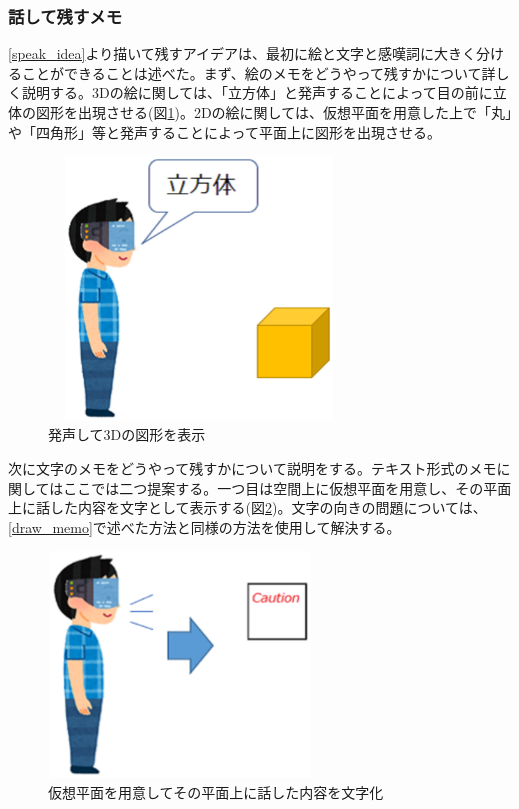 \documentclass[11pt,a4j, titlepage]{jarticle} %
\begin{document}
\subsubsection{話して残すメモ}
\ref{speak_idea}より描いて残すアイデアは、最初に絵と文字と感嘆詞に大きく分けることができることは述べた。まず、絵のメモをどうやって残すかについて詳しく説明する。3Dの絵に関しては、「立方体」と発声することによって目の前に立体の図形を出現させる(図\ref{fig:speak_3d})。2Dの絵に関しては、仮想平面を用意した上で「丸」や「四角形」等と発声することによって平面上に図形を出現させる。

\begin{figure}[H]
  \begin{center}
    \includegraphics[clip,height=7.0cm,width=8.0cm]{./speak_3d.eps}
    \caption{発声して3Dの図形を表示}
    \label{fig:speak_3d}
  \end{center}
\end{figure}

次に文字のメモをどうやって残すかについて説明をする。テキスト形式のメモに関してはここでは二つ提案する。一つ目は空間上に仮想平面を用意し、その平面上に話した内容を文字として表示する(図\ref{fig:text_memo})。文字の向きの問題については、\ref{draw_memo}で述べた方法と同様の方法を使用して解決する。

\begin{figure}[H]
  \begin{center}
    \includegraphics[clip,height=6.0cm,width=7.0cm]{./text_memo.eps}
    \caption{仮想平面を用意してその平面上に話した内容を文字化}
    \label{fig:text_memo}
  \end{center}
\end{figure}
\end{document}
